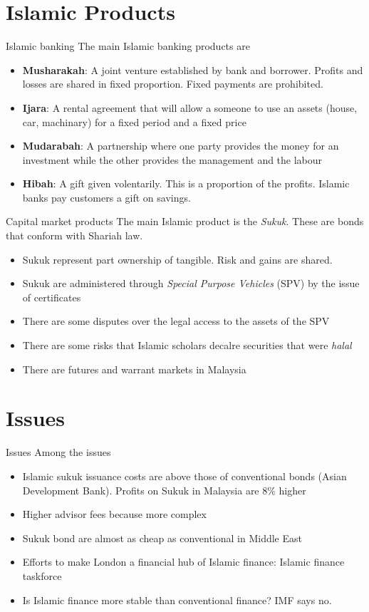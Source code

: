 \documentclass[14pt,xcolor=pdftex,dvipsnames,table]{beamer}\usepackage{graphicx, color}
\begin{document}
\section{Islamic Products}
\begin{frame}{Islamic banking}
The main Islamic banking products are
\begin{itemize}
\item \textbf{Musharakah}:  A joint venture established by bank and borrower. Profits and losses are shared in fixed proportion.  Fixed payments are prohibited. 
\item \textbf{Ijara}: A rental agreement that will allow a someone to use an assets (house, car, machinary) for a fixed period and a fixed price
\item \textbf{Mudarabah}: A partnership where one party provides the money for an investment while the other provides the management and the labour
\item \textbf{Hibah}:  A gift given volentarily.  This is a proportion of the profits. Islamic banks pay customers a gift on savings. 
\end{itemize}
\end{frame}

\begin{frame}{Capital market products}
The main Islamic product is the \emph{Sukuk}.  These are bonds that conform with Shariah law.  
\begin{itemize}
\item Sukuk represent part ownership of tangible.  Risk and gains are shared. 
\item Sukuk are administered through \emph{Special Purpose Vehicles} (SPV) by the issue of certificates
\item There are some disputes over the legal access to the assets of the SPV
\item There are some risks that Islamic scholars decalre securities that were \emph{halal}
\item There are futures and warrant markets in Malaysia
\end{itemize}
\end{frame}

 
\section{Issues}
\begin{frame}{Issues}
Among the issues
\begin{itemize}
\item Islamic sukuk issuance costs are above those of conventional bonds (Asian Development Bank).  Profits on Sukuk in Malaysia are 8\% higher
\item Higher advisor fees because more complex
\item Sukuk bond are almost as cheap as conventional in Middle East
\item Efforts to make London a financial hub of Islamic finance: Islamic finance taskforce
\item Is Islamic finance more stable than conventional finance?  IMF says no.
\end{itemize}
\end{frame}
\end{document}
